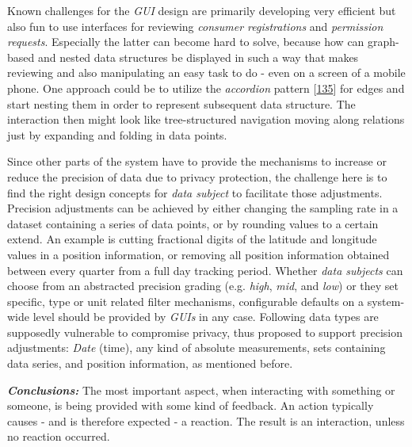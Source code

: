 \documentclass[12pt,english,a4paper,titlepage,cleardoublepage=empty,dottedtoc]{report}
\begin{document}
Known challenges for the \emph{GUI} design are primarily developing very
efficient but also fun to use interfaces for reviewing \emph{consumer
registrations} and \emph{permission requests}. Especially the latter can
become hard to solve, because how can graph-based and nested data
structures be displayed in such a way that makes reviewing and also
manipulating an easy task to do - even on a screen of a mobile phone.
One approach could be to utilize the \emph{accordion} pattern
{[}\protect\hyperlink{ref-web_2016_wikipedia_accordion-gui}{135}{]} for
edges and start nesting them in order to represent subsequent data
structure. The interaction then might look like tree-structured
navigation moving along relations just by expanding and folding in data
points.

Since other parts of the system have to provide the mechanisms to
increase or reduce the precision of data due to privacy protection, the
challenge here is to find the right design concepts for \emph{data
subject} to facilitate those adjustments. Precision adjustments can be
achieved by either changing the sampling rate in a dataset containing a
series of data points, or by rounding values to a certain extend. An
example is cutting fractional digits of the latitude and longitude
values in a position information, or removing all position information
obtained between every quarter from a full day tracking period. Whether
\emph{data subjects} can choose from an abstracted precision grading
(e.g. \emph{high}, \emph{mid}, and \emph{low}) or they set specific,
type or unit related filter mechanisms, configurable defaults on a
system-wide level should be provided by \emph{GUIs} in any case.
Following data types are supposedly vulnerable to compromise privacy,
thus proposed to support precision adjustments: \emph{Date} (time), any
kind of absolute measurements, sets containing data series, and position
information, as mentioned before.

\emph{\textbf{Conclusions:}} The most important aspect, when interacting
with something or someone, is being provided with some kind of feedback.
An action typically causes - and is therefore expected - a reaction. The
result is an interaction, unless no reaction occurred.
\end{document}
